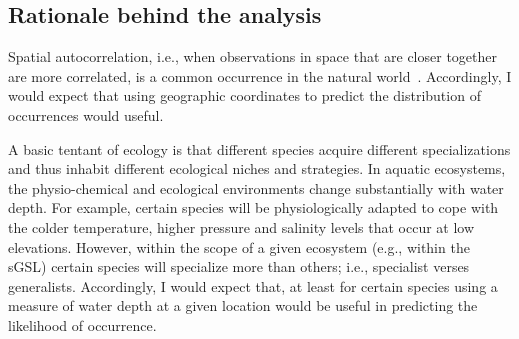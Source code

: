 \subsection{Rationale behind the analysis}

Spatial autocorrelation, i.e., when observations in space that are closer together are more correlated, is a common occurrence in the natural world~\cite{spac_wiki}.
Accordingly, I would expect that using geographic coordinates to predict the distribution of occurrences would useful.

A basic tentant of ecology is that different species acquire different specializations and thus inhabit different ecological niches and strategies.
In aquatic ecosystems, the physio-chemical and ecological environments change substantially with water depth.
For example, certain species will be physiologically adapted to cope with the colder temperature, higher pressure and salinity levels that occur at low elevations.
However, within the scope of a given ecosystem (e.g., within the sGSL) certain species will specialize more than others; i.e., specialist verses generalists.
Accordingly, I would expect that,  at least for certain species using a measure of water depth at a given location would be useful in predicting the likelihood of occurrence.
